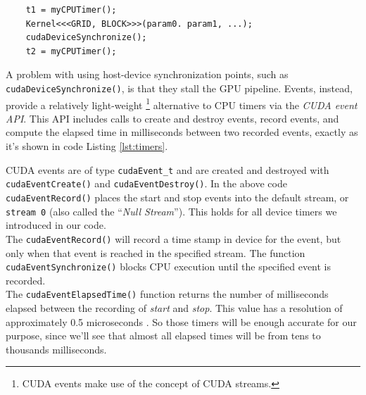 \begin{lstlisting}
	t1 = myCPUTimer();
	Kernel<<<GRID, BLOCK>>>(param0. param1, ...);
	cudaDeviceSynchronize();
	t2 = myCPUTimer();
\end{lstlisting}
A problem with using host-device synchronization points, such as \texttt{cudaDeviceSynchronize()}, is that they stall the GPU pipeline.
Events, instead, provide a relatively light-weight \footnote{CUDA events make use of the concept of CUDA streams.} alternative to CPU timers via the \textit{CUDA event API}. This API includes calls to create and destroy events, record events, and compute the elapsed time in milliseconds between two recorded events, exactly as it's shown in code Listing \ref{lst:timers}.
 
CUDA events are of type \texttt{cudaEvent\_t} and are created and destroyed with \texttt{cudaEventCreate()} and \texttt{cudaEventDestroy()}. In the above code \texttt{cudaEventRecord()} places the start and stop events into the default stream, or \texttt{stream 0} (also called the “\textit{Null Stream}”). This holds for all device timers we introduced in our code.\\
The \texttt{cudaEventRecord()} will record a time stamp in device for the event, but only when that event is reached in the specified stream. The function \texttt{cudaEventSynchronize()} blocks CPU execution until the specified event is recorded.\\
The \texttt{cudaEventElapsedTime()} function returns the number of milliseconds elapsed between the recording of \textit{start} and \textit{stop}. This value has a resolution of approximately 0.5 microseconds \cite{devblogevents,cudaguide}. So those timers will be enough accurate for our purpose, since we'll see that almost all elapsed times will be from tens to thousands milliseconds.

